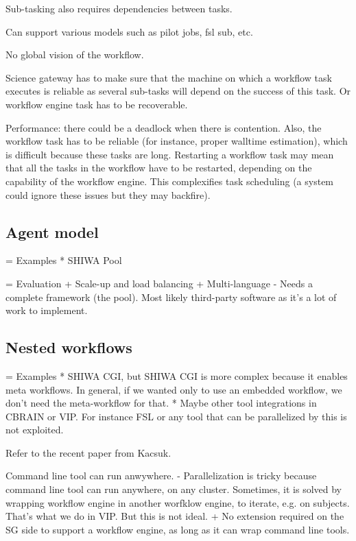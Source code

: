 \documentclass[preprint,3p,twocolumn]{elsarticle}
\begin{document}
Sub-tasking also requires dependencies between tasks.

Can support various models such as pilot jobs, fsl sub, etc.

No global vision of the workflow. 

Science gateway has to make sure that the machine on which a workflow
task executes is reliable as several sub-tasks will depend on the
success of this task. Or workflow engine task has to be recoverable.

Performance: there could be a deadlock when there is contention. Also,
the workflow task has to be reliable (for instance, proper walltime
estimation), which is difficult because these tasks are
long. Restarting a workflow task may mean that all the tasks in the
workflow have to be restarted, depending on the capability of the
workflow engine. This complexifies task scheduling (a system could
ignore these issues but they may backfire).


\subsection{Agent model}

= Examples
* SHIWA Pool

= Evaluation
+ Scale-up and load balancing
+ Multi-language
- Needs a complete framework (the pool). Most likely third-party software as it's a lot of work to implement.

\subsection{Nested workflows}

=  Examples
* SHIWA CGI, but SHIWA CGI is more complex because it enables meta workflows. In general, if we wanted only to use an embedded workflow, we don't need the meta-workflow for that. 
* Maybe other tool integrations in CBRAIN or VIP. For instance FSL or any tool that can be parallelized by this is not exploited.

Refer to the recent paper from Kacsuk. 

Command line tool can run anwywhere.
- Parallelization is tricky because command line tool can run anywhere, on any cluster. Sometimes, it is solved by wrapping workflow engine in another worfklow engine, to iterate, e.g. on subjects. That's what we do in VIP. But this is not ideal.
+ No extension required on the SG side to support a workflow engine, as long as it can wrap command line tools.
\end{document}
